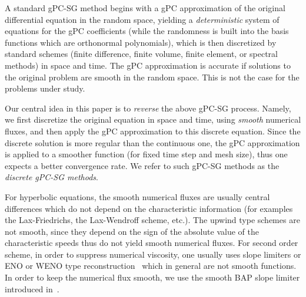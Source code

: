 \documentclass[12pt]{article}
\theoremstyle{plain}
\theoremstyle{remark}
\theoremstyle{remark}
\theoremstyle{remark}
\numberwithin{equation}{section}
\begin{document}
A standard gPC-SG method begins with a gPC approximation of the original
differential equation in the random space,  yielding a {\it deterministic} system of equations
for the gPC coefficients (while the randomness is built into the
basis functions which are orthonormal polynomials), which is then discretized
by standard schemes (finite difference, finite volume, finite element, or
spectral methods) in space and time. The gPC approximation
is accurate if solutions to the original problem are smooth in the random
space. This is not the case for the problems under study.

Our central idea in this paper is to {\it reverse} the above gPC-SG process.  Namely,
we first discretize the original equation in space and time, using {\it smooth} numerical fluxes, and then apply the gPC approximation to this discrete
equation.  Since the discrete solution is more regular than the continuous one,
the gPC approximation is applied to a smoother function (for fixed time step
and mesh  size), thus one expects a better convergence rate. We refer to
such gPC-SG methods as the {\it discrete gPC-SG methods}.

For hyperbolic equations, the smooth numerical fluxes are usually
central differences which do not depend on the characteristic information (for examples the Lax-Friedrichs, the Lax-Wendroff scheme, 
etc.). The upwind type schemes are not smooth, since they depend on the sign of
 the absolute value of the characteristic speeds thus do not yield smooth 
numerical fluxes.
 For second order scheme, in order to
suppress numerical viscosity, one usually uses slope limiters or ENO or
WENO type reconstruction~\cite{LeVeque, Tadmor:2000jlba, Tadmor:1990vlba} which in general are not smooth functions.
In order to keep the numerical flux smooth, we use the smooth BAP slope limiter
introduced in~\cite{Liu:1998faba}.
\end{document}
